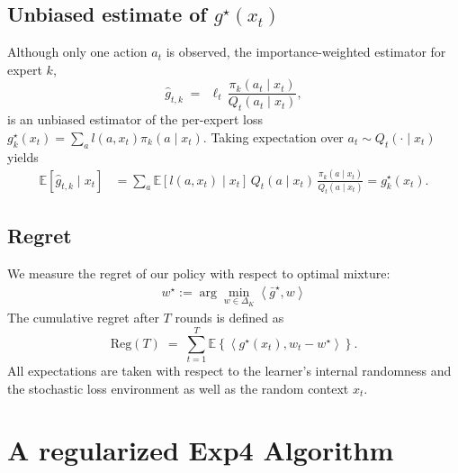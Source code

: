 \documentclass[11pt,letterpaper]{article}
\newcommand{\Exs}{\mathbb{E}}
\newcommand{\loss}{\ell}
\theoremstyle{plain}
\theoremstyle{definition}  %
\begin{document}
\subsection{Unbiased estimate of $g^\star(x_t)$}\label{sec:unbiased-grad}
Although only one action $a_t$ is observed, the importance-weighted estimator for expert $k$,
\begin{equation}
    \widehat{g}_{t,k}
    \;=\;
    \,\loss_t\,\frac{\pi_k(a_t \mid x_t)}{Q_t(a_t \mid x_t)},
    \label{eq:ips-estimator}
\end{equation}
is an unbiased estimator of the per-expert loss $g_k^\star(x_t) = \sum_a l(a,x_t)\pi_k(a\mid x_t)$.
Taking expectation over $a_t \sim Q_t(\cdot \mid x_t)$ yields
\begin{align}
    \mathbb{E}[\widehat{g}_{t,k} \mid x_t]
    &= \sum_a \Exs[ l(a,x_t) \mid x_t]\,Q_t(a\mid x_t)\,\frac{\pi_k(a\mid x_t)}{Q_t(a\mid x_t)}
     = g_k^\star(x_t).
\end{align}

\noindent 
\subsection{Regret} 
We measure the regret of our policy with respect to optimal mixture: 
%
\begin{align*}
    w^\star := \arg\min_{w \in \Delta_K} \left\langle \bar{g}^\star, w  \right\rangle 
\end{align*}
The cumulative regret after $T$ rounds  is defined as
\begin{equation}
\text{Reg}(T)
\;=\;
\sum_{t=1}^T \Exs \left\lbrace 
\left\langle  g^\star(x_t), w_t - w^\star \right\rangle  \right\rbrace.
\end{equation}
All expectations are taken with respect to the learner’s internal randomness and the stochastic loss environment as well as the random context $x_t$.





\section{A regularized Exp4 Algorithm}
\label{sec:algo}
\end{document}
